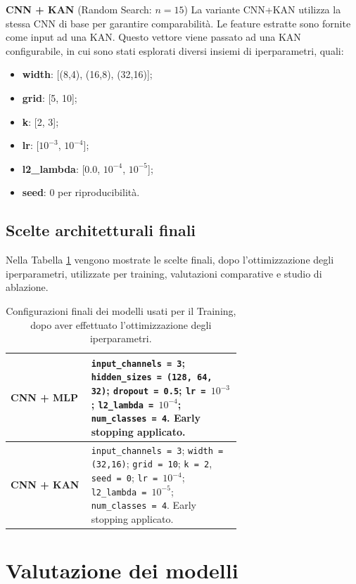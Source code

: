\documentclass[a4paper,12pt]{report}
\begin{document}
	\smallskip
	\noindent\textbf{CNN + KAN} \quad (Random Search: $n=15$)  
	La variante CNN+KAN utilizza la stessa CNN di base per garantire comparabilità. Le feature estratte sono fornite come input ad una KAN. Questo vettore viene passato ad una KAN configurabile, in cui sono stati esplorati diversi insiemi di iperparametri, quali: 
	\begin{itemize}
		\item \textbf{width}: [(8,4), (16,8), (32,16)];
		\item \textbf{grid}: [5, 10];
		\item \textbf{k}: [2, 3];
		\item \textbf{lr}: [$10^{-3}$, $10^{-4}$];
		\item \textbf{l2\_lambda}: [0.0, $10^{-4}$, $10^{-5}$];
		\item \textbf{seed}: 0 per riproducibilità.
	\end{itemize}
	
	\subsection{Scelte architetturali finali}
	Nella Tabella \ref{tab:model-config-image} vengono mostrate le scelte finali, dopo l'ottimizzazione degli iperparametri, utilizzate per training, valutazioni comparative e studio di ablazione.
	
	\begin{table}[H]
		\centering
		\caption{Configurazioni finali dei modelli usati per il Training, dopo aver effettuato l'ottimizzazione degli iperparametri.}
		\label{tab:model-config-image}
		\begin{tabular}{l p{0.65\linewidth}}
			\toprule
			\textbf{CNN + MLP} & \texttt{input\_channels = 3}; \texttt{hidden\_sizes = (128, 64, 32)}; \texttt{dropout = 0.5}; \texttt{lr = $10^{-3}$}; \texttt{l2\_lambda = $10^{-4}$}; \texttt{num\_classes = 4}. Early stopping applicato. \\
			\midrule
			\textbf{CNN + KAN} & \texttt{input\_channels = 3}; \texttt{width = (32,16)}; \texttt{grid = 10}; \texttt{k = 2}, \texttt{seed = 0}; \texttt{lr = $10^{-4}$}; \texttt{l2\_lambda = $10^{-5}$}; \texttt{num\_classes = 4}. Early stopping applicato. \\
			\bottomrule
		\end{tabular}
	\end{table}
	
	\section{Valutazione dei modelli}
	
\end{document}
